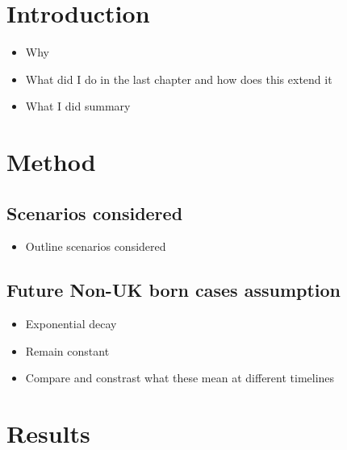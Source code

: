 \documentclass[11pt,twoside]{bristolthesis}
\providecommand{\tightlist}{%
  \setlength{\itemsep}{0pt}\setlength{\parskip}{0pt}}
\begin{document}
  \hypertarget{introduction-9}{%
  \section{Introduction}\label{introduction-9}}
  \begin{itemize}
  \tightlist
  \item
    Why
  \item
    What did I do in the last chapter and how does this extend it
  \item
    What I did summary
  \end{itemize}
  \hypertarget{method-4}{%
  \section{Method}\label{method-4}}
  
  \hypertarget{scenarios-considered}{%
  \subsection{Scenarios considered}\label{scenarios-considered}}
  \begin{itemize}
  \tightlist
  \item
    Outline scenarios considered
  \end{itemize}
  \hypertarget{future-non-uk-born-cases-assumption}{%
  \subsection{Future Non-UK born cases assumption}\label{future-non-uk-born-cases-assumption}}
  \begin{itemize}
  \tightlist
  \item
    Exponential decay
  \item
    Remain constant
  \item
    Compare and constrast what these mean at different timelines
  \end{itemize}
  \hypertarget{results-4}{%
  \section{Results}\label{results-4}}
  
\end{document}
